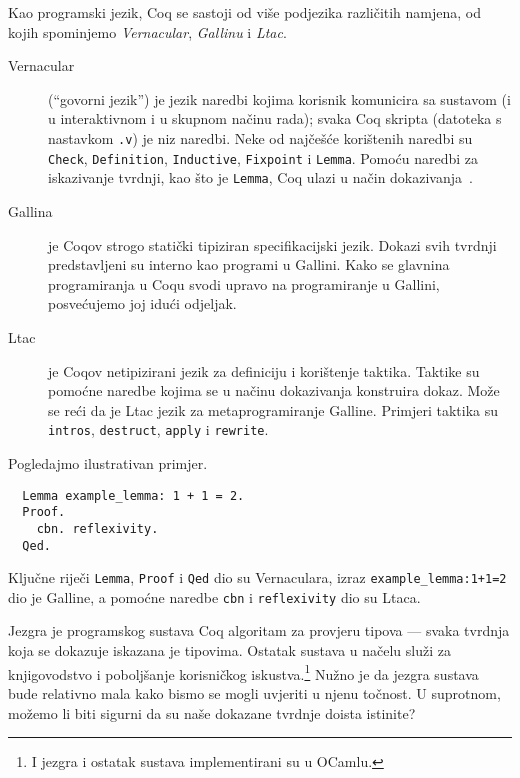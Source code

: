 Kao programski jezik, Coq se sastoji od više podjezika različitih namjena, od kojih spominjemo \textit{Vernacular}, \textit{Gallinu} i \textit{Ltac}.
\begin{description}
\item[Vernacular] (\enquote{govorni jezik}) je jezik naredbi kojima korisnik komunicira sa sustavom (i u interaktivnom i u skupnom načinu rada);
  svaka Coq skripta (datoteka s nastavkom \texttt{.v}) je niz naredbi.
  Neke od najčešće korištenih naredbi su \texttt{Check}, \texttt{Definition}, \texttt{Inductive}, \texttt{Fixpoint} i \texttt{Lemma}.
  Pomoću naredbi za iskazivanje tvrdnji, kao što je \texttt{Lemma}, Coq ulazi u način dokazivanja~.
\item[Gallina] je Coqov strogo statički tipiziran specifikacijski jezik.
  Dokazi svih tvrdnji predstavljeni su interno kao programi u Gallini.
  Kako se glavnina programiranja u Coqu svodi upravo na programiranje u Gallini, posvećujemo joj idući odjeljak.
\item[Ltac] je Coqov netipizirani jezik za definiciju i korištenje taktika.
  Taktike su pomoćne naredbe kojima se u načinu dokazivanja konstruira dokaz.
  Može se reći da je Ltac jezik za metaprogramiranje Galline.
  Primjeri taktika su \texttt{intros}, \texttt{destruct}, \texttt{apply} i \texttt{rewrite}.
\end{description} %
\noindent Pogledajmo ilustrativan primjer.
\begin{verbatim}
  Lemma example_lemma: 1 + 1 = 2.
  Proof.
    cbn. reflexivity.
  Qed.
\end{verbatim}
\noindent Ključne riječi \texttt{Lemma}, \texttt{Proof} i \texttt{Qed} dio su Vernaculara,
izraz \texttt{example\_lemma:1+1=2} dio je Galline,
a pomoćne naredbe \texttt{cbn} i \texttt{reflexivity} dio su Ltaca.

Jezgra je programskog sustava Coq algoritam za provjeru tipova  --- svaka tvrdnja koja se dokazuje iskazana je tipovima.
Ostatak sustava u načelu služi za knjigovodstvo i poboljšanje korisničkog iskustva.\footnote{I jezgra i ostatak sustava implementirani su u OCamlu.}
Nužno je da jezgra sustava bude relativno mala kako bismo se mogli uvjeriti u njenu točnost.
U suprotnom, možemo li biti sigurni da su naše dokazane tvrdnje doista istinite?

